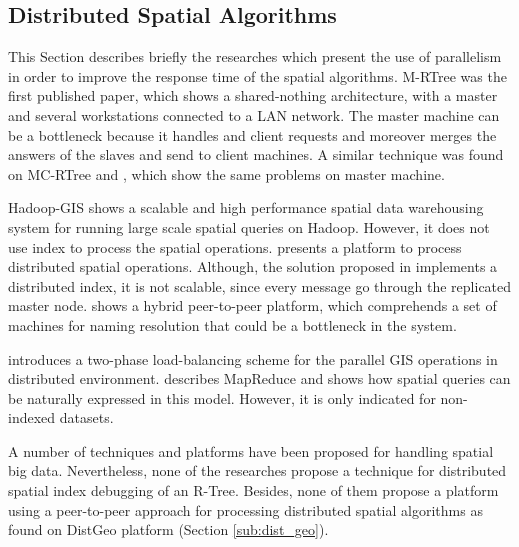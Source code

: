 \subsection{Distributed Spatial Algorithms}
\label{spatialdist}

This Section describes briefly the researches which present the use of parallelism in order to improve the response time of the spatial algorithms. 
M-RTree \cite{koudas1996declustering} was the first published paper, 
which shows a shared-nothing architecture, with a master and several workstations connected to a LAN network. 
The master machine can be a bottleneck because it handles and client requests and moreover merges the answers of the slaves and send to client machines. 
A similar technique was found on MC-RTree \cite{schnitzer1999master} and \cite{an1999storing}, which show the same problems on master machine.

Hadoop-GIS \cite{kerr2009alternative} shows a scalable and high performance spatial data warehousing system for running large scale spatial queries on Hadoop. 
However, it does not use index to process the spatial operations. \cite{dedsi} presents a platform to process distributed spatial operations. 
Although, the solution proposed in \cite{dedsi} implements a distributed index, it is not scalable, since every message go through the replicated master node. 
\cite{de2013processamento} shows a hybrid peer-to-peer platform, which comprehends a set of machines for naming resolution that could be
a bottleneck in the system.   

\cite{xie2008two} introduces a two-phase load-balancing scheme for the parallel GIS operations in distributed environment.
\cite{zhang2009spatial} describes MapReduce and shows how spatial queries can be naturally expressed in this model.
However, it is only indicated for non-indexed datasets. 

A number of techniques and platforms have been proposed for handling spatial big data.
Nevertheless, none of the researches propose a technique for distributed spatial index debugging of an R-Tree.
Besides, none of them propose a platform using a peer-to-peer approach for processing distributed spatial algorithms as found on DistGeo platform (Section \ref{sub:dist_geo}).